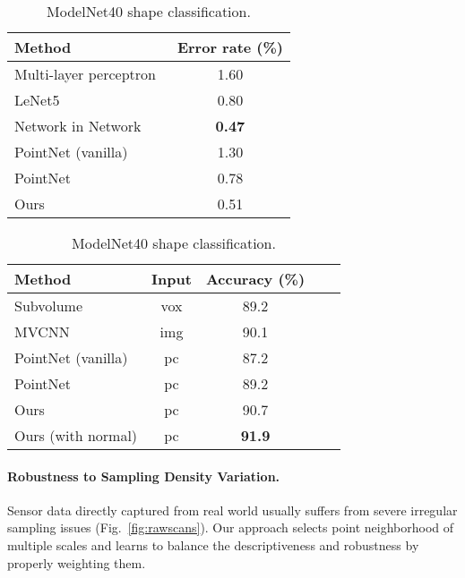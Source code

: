 \documentclass{article}
\begin{document}
\begin{table}[t!]
    \begin{minipage}{.45\textwidth}
        \centering
        \small
        \begin{tabular}{lc}
        \toprule
        Method     & Error rate (\%) \\
        \midrule
        Multi-layer perceptron~\cite{simard2003best} & 1.60     \\
        LeNet5~\cite{lecun1998gradient}     & 0.80      \\
        Network in Network~\cite{lin2013network}      & \textbf{0.47} \\
PointNet (vanilla)~\cite{qi2016pointnet}    & 1.30  \\
        PointNet~\cite{qi2016pointnet}    & 0.78  \\ \midrule
        Ours    & 0.51 \\
        \bottomrule
        \end{tabular}
        \caption{MNIST digit classification.}
        \label{tab:mnist}
    \end{minipage}
    \begin{minipage}{.55\textwidth}
        \centering
        \small
        \begin{tabular}[width=\linewidth]{lcccc}
        \toprule
        Method  & Input & Accuracy (\%) \\
        \midrule
Subvolume~\cite{qi2016volumetric} &vox & 89.2 \\
MVCNN~\cite{su15mvcnn} &img & 90.1 \\
PointNet (vanilla)~\cite{qi2016pointnet} &pc & 87.2 \\
        PointNet~\cite{qi2016pointnet} &pc & 89.2 \\ \midrule
        Ours  &pc & 90.7 \\ 
        Ours (with normal)   &pc&  \textbf{91.9} \\
        \bottomrule
        \end{tabular}
        \caption{ModelNet40 shape classification.}
        \label{tab:modelnet}
    \end{minipage}
  \end{table}

\vspace{-0.3cm}
\paragraph{Robustness to Sampling Density Variation.}
Sensor data directly captured from real world usually suffers from severe irregular sampling issues (Fig.~\ref{fig:rawscans}).
Our approach selects point neighborhood of multiple scales and learns to balance the descriptiveness and robustness by properly weighting them. 
\end{document}
